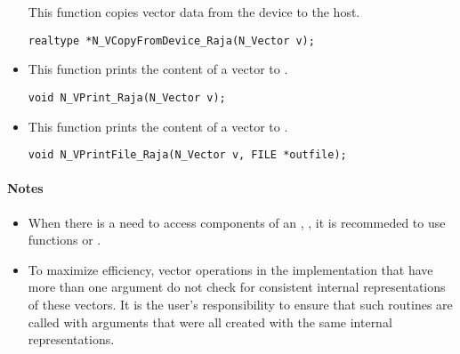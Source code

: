 \begin{itemize}
 This function copies vector data from the device to the host.

 \verb|realtype *N_VCopyFromDevice_Raja(N_Vector v);|



\item {}

  This function prints the content of a {\raja} vector to .

  \verb|void N_VPrint_Raja(N_Vector v);|


\item {}

  This function prints the content of a {\raja} vector to .

  \verb|void N_VPrintFile_Raja(N_Vector v, FILE *outfile);|


\end{itemize}
\paragraph{\bf Notes}

\begin{itemize}

\item
  When there is a need to access components of an , ,
  it is recommeded to use functions  or
  .


\item
  {\warn}To maximize efficiency, vector operations in the {\nvecraja} implementation
  that have more than one  argument do not check for
  consistent internal representations of these vectors. It is the user's
  responsibility to ensure that such routines are called with 
  arguments that were all created with the same internal representations.

\end{itemize}

